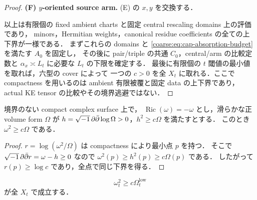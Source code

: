 \documentclass[a4paper,11pt]{ltjsarticle}
\numberwithin{equation}{section}
\theoremstyle{plain}
\theoremstyle{definition}
\theoremstyle{remark}
\newcommand{\Ric}{\operatorname{Ric}}\newcommand{\tr}{\operatorname{tr}}\newcommand{\osc}{\operatorname{osc}}\newcommand{\vol}{\operatorname{Vol}}
\begin{document}
\begin{proof}
\medskip\noindent
\textbf{(F) $y$-oriented source arm.}
(E) の $x,y$ を交換する．

以上は有限個の fixed ambient charts と固定 central rescaling domains 上の評価であり，
minors，Hermitian weights，canonical residue coefficients の全ての上下界が一様である．
まずこれらの domains と \eqref{coarse:eq:cap-absorption-budget} を満たす $A_0$ を固定し，
その後に pair/triple の共通 $C_0$，central/arm の比較定数と
$\alpha_x\asymp L_t$ に必要な $L_t$ の下限を確定する．
最後に有限個の $t$ 閾値の最小値を取れば，六型の cover によって
一つの $c>0$ を全 $X_t$ に取れる．ここで compactness を用いるのは ambient
有限被覆と固定 data の上下界であり，actual KE tensor の比較やその境界逃避ではない．
\end{proof}

\begin{lemma}
\label{coarse:lem:one-sided-volume}
境界のない compact complex surface 上で，
$\Ric(\omega)=-\omega$ とし，滑らかな正 volume form $\Omega$ が
$h=\sqrt{-1}\,\partial\bar\partial\log\Omega>0$，$h^2\ge c\Omega$ を満たすとする．
このとき $\omega^2\ge c\Omega$ である．
\end{lemma}

\begin{proof}
$r=\log(\omega^2/\Omega)$ は compactness により最小点 $p$ を持つ．
そこで $\sqrt{-1}\,\partial\bar\partial r=\omega-h\ge0$ なので
$\omega^2(p)\ge h^2(p)\ge c\Omega(p)$ である．
したがって $r(p)\ge\log c$ であり，全点で同じ下界を得る．
\end{proof}

\begin{corollary}[大域 volume 下界]\label{coarse:cor:global-volume-lower}
\begin{equation}\label{coarse:eq:actual-volume-lower}
 \omega_t^2\ge c\Omega_t^{\mathrm{low}}
\end{equation}
が全 $X_t$ で成立する．
\end{corollary}
\end{document}
